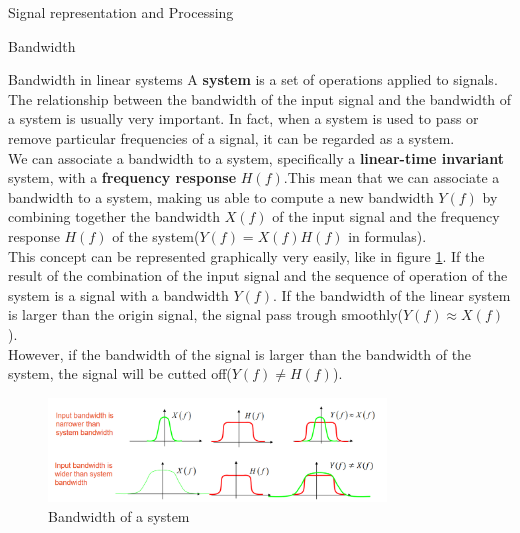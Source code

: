 \begin{section}{Signal representation and Processing}
\begin{subsection}{Bandwidth}
    \begin{subsubsection}{Bandwidth in linear systems}
      A \textbf{system} is a set of operations applied to signals.\\
      The relationship between the bandwidth of the input signal and the bandwidth of a system is
      usually very important. In fact, when a system is used to pass or remove particular 
      frequencies of a signal, it can be regarded as a system.\\
      We can associate a bandwidth to a system, specifically a \textbf{linear-time invariant} system,
      with a \textbf{frequency response} $H(f)$.This mean that we can associate a bandwidth to a
      system, making us able to compute a new bandwidth $Y(f)$ by combining together the bandwidth 
      $X(f)$ of the input signal and the frequency response $H(f)$ of the system($Y(f) = X(f)H(f)$
      in formulas).\\
      This concept can be represented graphically very easily, like in figure 
      \ref{fig:Bandwidth System}. If the result of the combination of the input signal and the
      sequence of operation of the system is a signal with a bandwidth $Y(f)$. If the bandwidth of 
      the linear system is larger than the origin signal, the signal pass trough smoothly($Y(f) \approx X(f)$).\\
      However, if the bandwidth of the signal is larger than the bandwidth of the system, the signal
      will be cutted off($Y(f) \ne H(f)$).\\

      \begin{figure}[h]
        \centering
        \includegraphics[width=0.8\textwidth]{img/bandwidth system.png}
        \caption{Bandwidth of a system}
        \label{fig:Bandwidth System}
      \end{figure}
    \end{subsubsection}
  \end{subsection}


\end{section}
